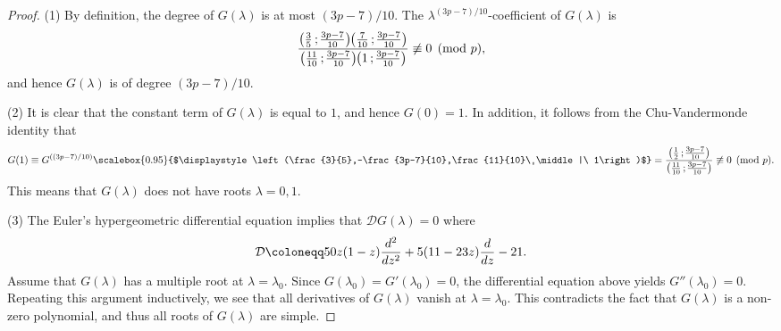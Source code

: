 \documentclass{article}
\theoremstyle{definition}
\begin{document}
\begin{proof}
(1) By definition, the degree of $G(\lambda)$ is at most $(3p-7)/10$.
The $\lambda^{(3p-7)/10}$-coefficient of $G(\lambda)$ is\vspace{-0.9mm}
\[
    \frac{\bigl(\frac{3}{5}\,;\hspace{-0.2mm}\frac{3p-7}{10}\bigr)\hspace{-0.3mm}\bigl(\frac{7}{10}\,;\hspace{-0.2mm}\frac{3p-7}{10}\bigr)}{\bigl(\frac{11}{10}\,;\hspace{-0.2mm}\frac{3p-7}{10}\bigr)\hspace{-0.3mm}\bigl(1\,;\hspace{-0.2mm}\frac{3p-7}{10}\bigr)} \not\equiv 0 \pmod{p},
\]
and hence $G(\lambda)$ is of degree $(3p-7)/10$.\par
\hspace{5.8mm}(2) It is clear that the constant term of $G(\lambda)$ is equal to $1$, and hence $G(0) = 1$.
In addition, it follows from the Chu-Vandermonde identity that\vspace{-1.9mm}
\[
    G(1) \equiv G^{((3p-7)/10)}\scalebox{0.95}{$\displaystyle\left(\frac{3}{5},-\frac{3p-7}{10},\frac{11}{10}\ \middle|\ 1\right)$} = \frac{\bigl(\frac{1}{2}\,;\hspace{-0.2mm}\frac{3p-7}{10}\bigr)}{\bigl(\frac{11}{10}\,;\hspace{-0.2mm}\frac{3p-7}{10}\bigr)} \not\equiv 0 \pmod{p}.\vspace{-1.9mm}
\]
This means that $G(\lambda)$ does not have roots $\lambda=0,1$.\par
\hspace{5.8mm}(3) The Euler's hypergeometric differential equation implies that $\mathcal{D}G(\lambda)=0$ where\vspace{-1.4mm}
\[
    \mathcal{D} \coloneqq 50z(1-z)\frac{d^2}{dz^2} + 5(11-23z)\frac{d}{dz}-21.\vspace{-0.3mm}
\]
Assume that $G(\lambda)$ has a multiple root at $\lambda = \lambda_0$.
Since $G(\lambda_0)=G'(\lambda_0)=0$, the differential equation above yields $G''(\lambda_0) = 0$.
Repeating this argument inductively, we see that all derivatives of $G(\lambda)$ vanish at $\lambda = \lambda_0$.
This contradicts the fact that $G(\lambda)$ is a non-zero polynomial, and thus all roots of $G(\lambda)$ are simple.
\end{proof}
\end{document}
